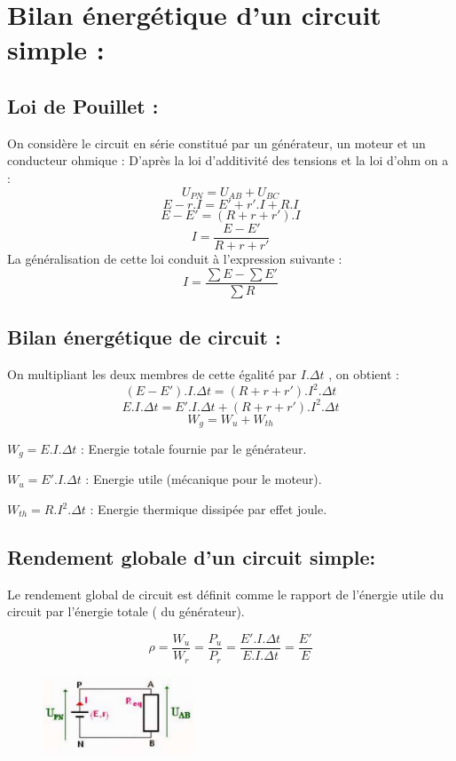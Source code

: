 \documentclass[12pt]{article}
\begin{document}
\section{Bilan énergétique d’un circuit simple : }
\subsection{Loi de Pouillet : }
On considère le circuit en série constitué par un
générateur, un moteur et un conducteur ohmique :
D’après la loi d’additivité des tensions et la loi
d’ohm on a :
$$U_{PN} = U_{AB} + U_{BC}$$
$$E - r. I = E' + r'.I + R. I$$
$$E - E' = (R + r + r').I$$
$$I = \frac{E-E'}{R + r +r'}$$
La généralisation de cette loi conduit à l’expression suivante :
$$I = \frac{\sum E - \sum E'}{\sum R}$$

\subsection{Bilan énergétique de circuit : }
On multipliant les deux membres de cette égalité par $I. \Delta{t}$ , on obtient :
$$(E - E').I.\Delta{t} = (R + r + r').I^2.\Delta{t}$$
$$E.I.\Delta{t} = E'.I.\Delta{t} + (R + r + r').I^2.\Delta{t}$$
$$W_g = W_u + W_{th}$$

$W_g = E.I.\Delta{t}$ : Energie totale fournie par le générateur.

$W_u = E'. I. \Delta{t}$ : Energie utile (mécanique pour le moteur).

$W_{th} = R.I^2.\Delta{t}$ : Energie thermique dissipée par effet joule.

\subsection{Rendement globale d’un circuit simple: }
Le rendement global de circuit est définit comme le rapport de l’énergie utile du circuit
par l’énergie totale ( du générateur).

$$\rho = \frac{W_u}{W_r} = \frac{P_u}{P_r} = \frac{E'.I.\Delta{t}}{E.I.\Delta{t}} = \frac{E'}{E}$$

\begin{figure}
  \vspace{-1cm}
    \includegraphics[width=0.4\textwidth]{./img/circuit_forceElectro.png}
\end{figure}
\end{document}
